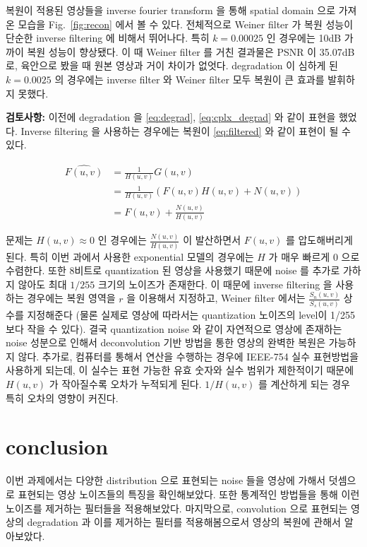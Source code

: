 \documentclass[a4paper, 12p]{paper}
\begin{document}
복원이 적용된 영상들을 inverse fourier transform 을 통해 spatial domain 으로 가져온 모습을 Fig.~\ref{fig:recon} 에서 볼 수 있다. 전체적으로 Weiner filter 가 복원 성능이 단순한 inverse filtering 에 비해서 뛰어나다. 특히 $k=0.00025$ 인 경우에는 10dB 가까이 복원 성능이 향상됐다. 이 때 Weiner filter 를 거친 결과물은 PSNR 이 35.07dB로, 육안으로 봤을 때 원본 영상과 거이 차이가 없엇다. degradation 이 심하게 된 $k=0.0025$ 의 경우에는 inverse filter 와 Weiner filter 모두 복원이 큰 효과를 발휘하지 못했다.

\vspace{0.1in}
\noindent\textbf{검토사항:} 이전에 degradation 을 \eqref{eq:degrad}, \eqref{eq:cplx_degrad} 와 같이 표현을 했었다. Inverse filtering 을 사용하는 경우에는 복원이 \eqref{eq:filtered} 와 같이 표현이 될 수 있다.

\begin{align}
  \hat{F(u, v)} &= \frac{1}{H(u, v)}G(u, v) \\
                &= \frac{1}{H(u, v)}(F(u, v)H(u, v) + N(u, v)) \\
                &= F(u, v) + \frac{N(u, v)}{H(u, v)} \label{eq:filtered}
\end{align}

문제는 $H(u, v) \approx 0$ 인 경우에는 $\frac{N(u, v)}{H(u, v)}$ 이 발산하면서 $F(u, v)$ 를 압도해버리게 된다. 특히 이번 과에서 사용한 exponential 모델의 경우에는 $H$ 가 매우 빠르게 0 으로 수렴한다. 또한 8비트로 quantization 된 영상을 사용했기 때문에 noise 를 추가로 가하지 않아도 최대 $1/255$ 크기의 노이즈가 존재한다. 이 때문에 inverse filtering 을 사용하는 경우에는 복원 영역을 $r$ 을 이용해서 지정하고, Weiner filter 에서는 $\frac{S_n(u, v)}{S_s(u, v)}$ 상수를 지정해준다 (물론 실제로 영상에 따라서는 quantization 노이즈의 level이 1/255 보다 작을 수 있다). 결국 quantization noise 와 같이 자연적으로 영상에 존재하는 noise 성분으로 인해서 deconvolution 기반 방법을 통한 영상의 완벽한 복원은 가능하지 않다. 추가로, 컴퓨터를 통해서 연산을 수행하는 경우에 IEEE-754 실수 표현방법을 사용하게 되는데, 이 실수는 표현 가능한 유효 숫자와 실수 범위가 제한적이기 때문에 $H(u, v)$ 가 작아질수록 오차가 누적되게 된다. $1/H(u, v)$ 를 계산하게 되는 경우 특히 오차의 영향이 커진다.


\section{conclusion}
이번 과제에서는 다양한 distribution 으로 표현되는 noise 들을 영상에 가해서 덧셈으로 표현되는 영상 노이즈들의 특징을 확인해보았다. 또한 통계적인 방법들을 통해 이런 노이즈를 제거하는 필터들을 적용해보았다. 마지막으로, convolution 으로 표현되는 영상의 degradation 과 이를 제거하는 필터를 적용해봄으로서 영상의 복원에 관해서 알아보았다.
\end{document}
